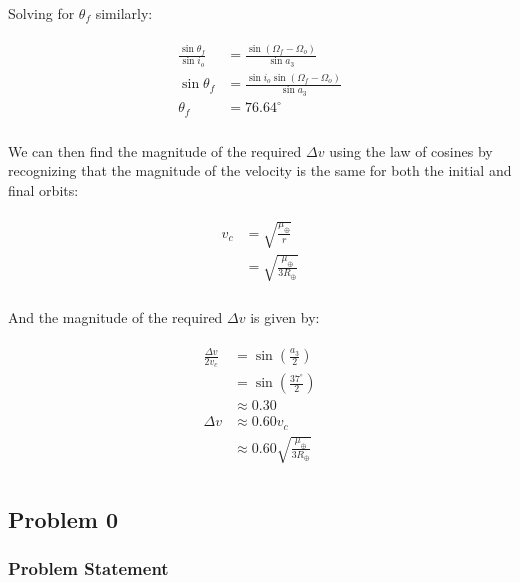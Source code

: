 \documentclass[
]{article}
\begin{document}
Solving for \(\theta_f\) similarly:

\[\begin{aligned}
\begin{aligned}
    \frac{\sin\theta_f}{\sin i_o} &= \frac{\sin(\Omega_f - \Omega_o)}{\sin a_3} \\
    \sin\theta_f &= \frac{\sin i_o \sin(\Omega_f - \Omega_o)}{\sin a_3} \\
    \theta_f &= 76.64^\circ \\
\end{aligned}
\end{aligned}\]

We can then find the magnitude of the required \(\Delta v\) using the
law of cosines by recognizing that the magnitude of the velocity is the
same for both the initial and final orbits:

\[\begin{aligned}
\begin{aligned}
    v_c &= \sqrt{\frac{\mu_\oplus}{r}} \\
    &= \sqrt{\frac{\mu_\oplus}{3R_\oplus}} \\
\end{aligned}
\end{aligned}\]

And the magnitude of the required \(\Delta v\) is given by:

\[\begin{aligned}
\begin{aligned}
    \frac{\Delta v}{2 v_c} &= \sin\left( \frac{a_3}{2} \right) \\
    &= \sin\left( \frac{37^\circ}{2} \right) \\
    &\approx 0.30 \\
    \Delta v &\approx 0.60 v_c \\
    &\approx 0.60 \sqrt{\frac{\mu_\oplus}{3R_\oplus}} \\
\end{aligned}
\end{aligned}\]

\subsection{Problem 0}\label{problem-0}

\subsubsection{Problem Statement}\label{problem-statement-1}
\end{document}
